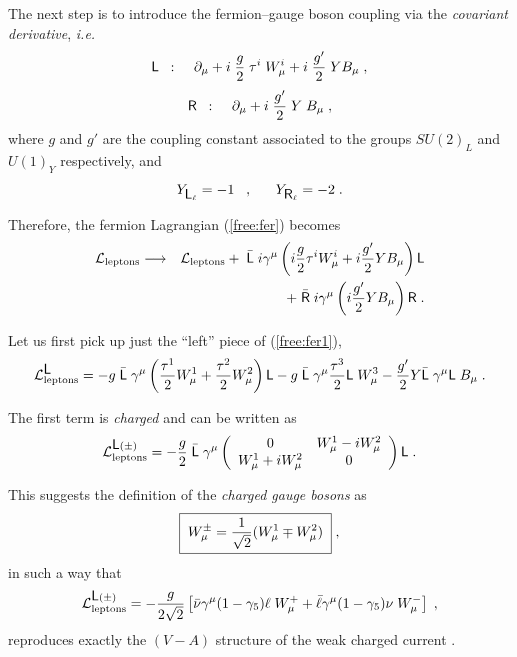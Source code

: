 \documentclass[12pt]{report}
\def\text#1{{\scriptstyle\mathrm{#1}}}
\newcommand{\gc}{\gamma_5}
\newcommand{\g}{\gamma}
\newcommand{\ld}{\mbox{\sf L}}
\newcommand{\rs}{\mbox{\sf R}}
\newcommand{\lag}{{\cal L}}
\newcommand{\del}{\partial}
\newcommand{\ba}{\begin{array}}
\newcommand{\ea}{\end{array}}
\begin{document}
The next step is to introduce the fermion--gauge boson coupling via
the {\it covariant derivative}, {\it i.e.}
\begin{equation}
\ld \;\; : \;\; \;\; \del_\mu + i \; \frac{g}{2} \; { \tau^i} \; W^i_\mu 
+ i \; \frac{g'}{2} \; { Y} B_\mu \; ,
\label{cov:l}
\end{equation}
\begin{equation}
\rs \;\; : \;\; \;\; \del_\mu + i \; \frac{g'}{2}\; { Y} \; B_\mu \; ,
\label{cov:r}
\end{equation}
where $g$ and $g'$ are the coupling constant associated to the groups
$SU(2)_L$ and $U(1)_Y$ respectively, and
\begin{equation}
Y_{\ld_\ell} = -1 \;\;\; , \;\;\;\;\;\; Y_{\rs_\ell} = -2 \; .
\label{hyp:lep}
\end{equation}

Therefore, the fermion Lagrangian (\ref{free:fer}) becomes
\begin{eqnarray}
\lag_{\text{leptons}} & \longrightarrow & \lag_{\text{leptons}} 
 + \;
\bar{\ld} \; i \g^\mu \left( i\frac{g}{2} \tau^i W^i_\mu 
+ i \frac{g'}{2} Y B_\mu \right ) \ld \nonumber \\
&& \; + \; \bar{\rs} \; i \g^\mu \left(i \frac{g'}{2} Y B_\mu \right) \rs
\; .
\label{free:fer1}
\end{eqnarray}

Let us first pick up just the ``left'' piece of (\ref{free:fer1}),
\[
\lag_{\text{leptons}}^{\ld} = - g \; \bar{\ld} \; \g^\mu
\left(\frac{\tau^1}{2} W^1_\mu + \frac{\tau^2}{2} W^2_\mu \right) \ld
- g \; \bar{\ld} \; \g^\mu \frac{\tau^3}{2} \ld \; W^3_\mu
- \frac{g'}{2}  Y \bar{\ld} \; \g^\mu \ld \; B_\mu \; .
\]

The first term is {\it charged} and can be written as
\[
\lag_{\text{leptons}}^{\ld (\pm)} = 
- \frac{g}{2} \; \bar{\ld} \; \g^\mu 
\left( \ba{cc}
0 			& W^1_\mu - i W^2_\mu \\
W^1_\mu + i W^2_\mu 	& 0
\ea \right) \ld  \; .
\]

This suggests the definition of the {\it charged gauge bosons} as
\begin{equation}
\fbox{$ \; \displaystyle{W^\pm_\mu = 
\frac{1}{\sqrt{2}} (W_\mu^1 \mp W_\mu^2)} \; $} \; ,
\label{w}
\end{equation}
in such a way that
\begin{equation}
\lag_{\text{leptons}}^{\ld (\pm)} = - { \frac{g}{2\sqrt{2}}} 
\left[	\bar{\nu}  \g^\mu (1 - \gc) \ell \;  W^+_\mu +  
	\bar{\ell} \g^\mu (1 - \gc) \nu \; W^-_\mu \right] \; ,
\label{l:w2}
\end{equation}
reproduces exactly the $(V-A)$ structure of the weak charged current . 
\end{document}
